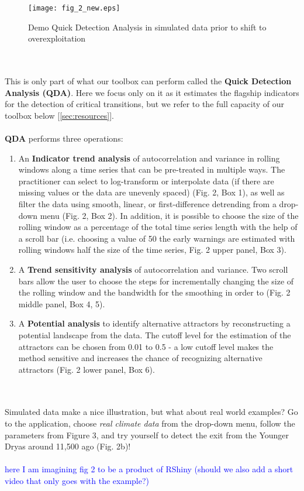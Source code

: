 \documentclass[12pt,a4paper,final]{article}
\begin{document}
\begin{figure}[ht]
\begin{center}
\texttt{[image: fig\_2\_new.eps]}
\caption{Demo Quick Detection Analysis in simulated data prior to shift to overexploitation}
\end{center}
\label{fig:simulatedQDA}
\end{figure}
\\
\\
This is only part of what our toolbox can perform called the \textbf{Quick Detection Analysis (QDA)}. Here we focus only on it as it estimates the flagship indicators for the detection of critical transitions, but we refer to the full capacity of our toolbox below [\ref{sec:resources}].
\\
\\ 
\textbf{QDA} performs three operations:
\begin{enumerate}
\item An \textbf{Indicator trend analysis} of autocorrelation and variance in rolling windows along a time series that can be pre-treated in multiple ways. The practitioner can select to log-transform or interpolate data (if there are missing values or the data are unevenly spaced) (Fig. 2, Box 1), as well as filter the data using smooth, linear, or first-difference detrending from a drop-down menu (Fig. 2, Box 2). In addition, it is possible to choose the size of the rolling window as a percentage of the total time series length with the help of a scroll bar (i.e. choosing a value of 50 the early warnings are estimated with rolling windows half the size of the time series, Fig. 2 upper panel, Box 3).
\item A  \textbf{Trend sensitivity analysis} of autocorrelation and variance. Two scroll bars allow the user to choose the steps for incrementally changing the size of the rolling window and the bandwidth for the smoothing in order to (Fig. 2 middle panel, Box 4, 5). 
\item A \textbf{Potential analysis} to identify alternative attractors by reconstructing a potential landscape from the data. The cutoff level for the estimation of the attractors can be chosen from 0.01 to 0.5 - a low cutoff level makes the method sensitive and increases the chance of recognizing alternative attractors (Fig. 2 lower panel, Box 6).
\end{enumerate}
\\
\\
Simulated data make a nice illustration, but what about real world examples? Go to the application, choose \textit{real climate data} from the drop-down menu, follow the parameters from Figure 3, and try yourself to detect the exit from the Younger Dryas around 11,500 ago (Fig. 2b)! 
\\
\\
\textcolor{blue}{here I am imagining fig 2 to be a product of RShiny (should we also add a short video that only goes with the example?)}
\end{document}
